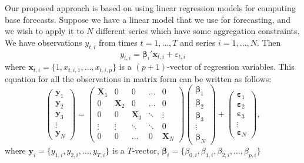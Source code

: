 \documentclass[11pt,a4paper,]{article}
\begin{document}
Our proposed approach is based on using linear regression models for
computing base forecasts. Suppose we have a linear model that we use for
forecasting, and we wish to apply it to \(N\) different series which
have some aggregation constraints. We have observations \(y_{t,i}\) from
times \(t=1,\dots,T\) and series \(i=1,\dots,N\). Then
\begin{equation}\label{eq:basicequation}
  y_{t,i} = \bm{\beta}_{i}' \bm{x}_{t,i} + \varepsilon_{t,i}
\end{equation} where \(\bm{x}_{t,i}=\{1, x_{t,i,1},\dots,x_{t,i,p}\}\)
is a \((p+1)\)-vector of regression variables. This equation for all the
observations in matrix form can be written as follows:
\begin{equation}\label{eq:linearmodel}
  \begin{pmatrix}
  \bm{y}_1\\
  \bm{y}_2\\
  \bm{y}_3 \\
  \vdots\\
  \bm{y}_N
  \end{pmatrix}=
  \begin{pmatrix}
  \bm{X}_1 & 0        & 0        & \dots  & 0\\
  0        & \bm{X}_2 & 0        & \dots  & 0\\
  0        & 0        & \bm{X}_3 & \ddots & \vdots \\
  \vdots   & \vdots   & \ddots   & \ddots & 0\\
  0        & 0        & \dots    & 0      & \bm{X}_N
  \end{pmatrix}
  \begin{pmatrix}
  \bm{\beta}_1\\
  \bm{\beta}_2\\
  \bm{\beta}_3\\
  \vdots\\
  \bm{\beta}_N
  \end{pmatrix}+
  \begin{pmatrix}
  \bm{\varepsilon}_1\\
  \bm{\varepsilon}_2\\
  \bm{\varepsilon}_3\\
  \vdots \\
  \bm{\varepsilon}_N
  \end{pmatrix},
\end{equation} where \(\bm{y}_i = \{y_{1,i}, y_{2,i}, \dots, y_{T,i}\}\)
is a \(T\)-vector,
\({\bm{\beta}}_i = \{\beta_{0,i}, \beta_{1,i}, \beta_{2,i}, \dots, \beta_{p,i}\}\)
\end{document}
